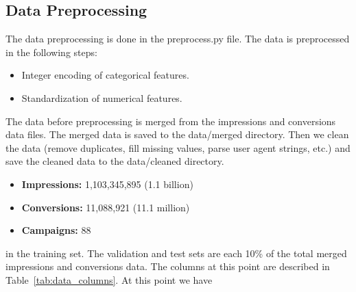 \documentclass[11pt]{article}
\begin{document}
\subsection{Data Preprocessing}

The data preprocessing is done in the preprocess.py file. The data is preprocessed in the following steps:

\begin{itemize}
  \item Integer encoding of categorical features.
  \item Standardization of numerical features.
\end{itemize}

The data before preprocessing is merged from the impressions and conversions data files.
The merged data is saved to the data/merged directory. Then we clean the data
(remove duplicates, fill missing values, parse user agent strings, etc.)
and save the cleaned data to the data/cleaned directory. 
\begin{itemize}
  \item \textbf{Impressions:} 1,103,345,895 (1.1 billion)
  \item \textbf{Conversions:} 11,088,921 (11.1 million)
  \item \textbf{Campaigns:} 88
\end{itemize} in the training set.
 The validation and test sets are  each 10\% of the total merged impressions and conversions data.
The columns at this point are 
described in Table~\ref{tab:data_columns}. At this point we have 
\end{document}
